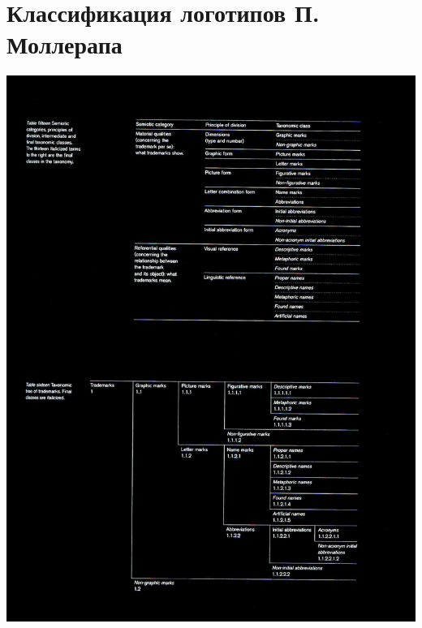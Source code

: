 \section{Классификация логотипов П. Моллерапа}
\label{app:mollerup}

\begin{center}
  \includegraphics[width=.7\linewidth]{images/mollerup1}
\end{center}
